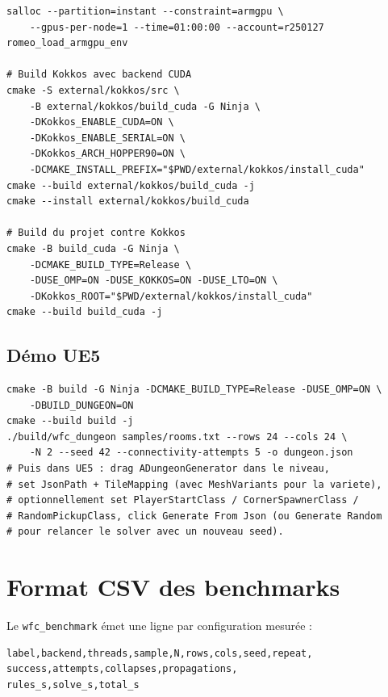 \begin{verbatim}
salloc --partition=instant --constraint=armgpu \
    --gpus-per-node=1 --time=01:00:00 --account=r250127
romeo_load_armgpu_env

# Build Kokkos avec backend CUDA
cmake -S external/kokkos/src \
    -B external/kokkos/build_cuda -G Ninja \
    -DKokkos_ENABLE_CUDA=ON \
    -DKokkos_ENABLE_SERIAL=ON \
    -DKokkos_ARCH_HOPPER90=ON \
    -DCMAKE_INSTALL_PREFIX="$PWD/external/kokkos/install_cuda"
cmake --build external/kokkos/build_cuda -j
cmake --install external/kokkos/build_cuda

# Build du projet contre Kokkos
cmake -B build_cuda -G Ninja \
    -DCMAKE_BUILD_TYPE=Release \
    -DUSE_OMP=ON -DUSE_KOKKOS=ON -DUSE_LTO=ON \
    -DKokkos_ROOT="$PWD/external/kokkos/install_cuda"
cmake --build build_cuda -j
\end{verbatim}

\subsection{Démo UE5}

\begin{verbatim}
cmake -B build -G Ninja -DCMAKE_BUILD_TYPE=Release -DUSE_OMP=ON \
    -DBUILD_DUNGEON=ON
cmake --build build -j
./build/wfc_dungeon samples/rooms.txt --rows 24 --cols 24 \
    -N 2 --seed 42 --connectivity-attempts 5 -o dungeon.json
# Puis dans UE5 : drag ADungeonGenerator dans le niveau,
# set JsonPath + TileMapping (avec MeshVariants pour la variete),
# optionnellement set PlayerStartClass / CornerSpawnerClass /
# RandomPickupClass, click Generate From Json (ou Generate Random
# pour relancer le solver avec un nouveau seed).
\end{verbatim}

\section{Format CSV des benchmarks}
\label{sec:annexes:csv}

Le \texttt{wfc\_benchmark} émet une ligne par configuration mesurée :

\begin{verbatim}
label,backend,threads,sample,N,rows,cols,seed,repeat,
success,attempts,collapses,propagations,
rules_s,solve_s,total_s
\end{verbatim}

